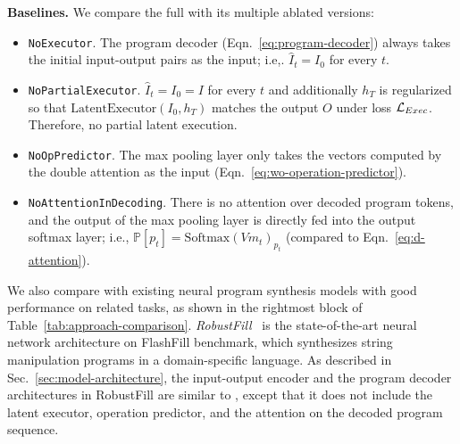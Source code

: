 \textbf{Baselines.} We compare the full {\ours} with its multiple ablated versions:
\begin{itemize}[noitemsep,topsep=0pt,parsep=0pt,partopsep=0pt]%
    \item \texttt{NoExecutor}. The program decoder (Eqn.~\ref{eq:program-decoder}) always takes the initial input-output pairs as the input; i.e,. $\hat I_t = I_0$ for every $t$.
    \item \texttt{NoPartialExecutor}. $\hat I_t = I_0=I$ for every $t$ and additionally $h_T$ is regularized so that $\mathrm{LatentExecutor}(I_0, h_T)$ matches the output $O$ under loss $\mathcal{L}_{Exec}$. Therefore, no partial latent execution. 
    \item \texttt{NoOpPredictor}. The max pooling layer only takes the vectors computed by the double attention as the input (Eqn.~\ref{eq:wo-operation-predictor}).
    \item \texttt{NoAttentionInDecoding}. There is no attention over decoded program tokens, and the output of the max pooling layer is directly fed into the output softmax layer; i.e., $\mathbb{P}[p_t]=\mathrm{Softmax}(Vm_t)_{p_t}$ (compared to Eqn.~\ref{eq:d-attention}).
\end{itemize}
We also compare with existing neural program synthesis models with good performance on related tasks, as shown in the rightmost block of Table~\ref{tab:approach-comparison}. \emph{RobustFill}~\cite{devlin2017robustfill} is the state-of-the-art neural network architecture on FlashFill benchmark, which synthesizes string manipulation programs in a domain-specific language. As described in Sec.~\ref{sec:model-architecture}, the input-output encoder and the program decoder architectures in RobustFill are similar to {\ours}, except that it does not include the latent executor, operation predictor, and the attention on the decoded program sequence.  

